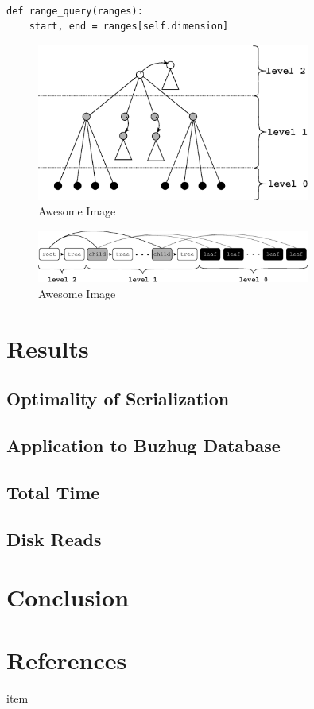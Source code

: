 \documentclass[11pt, oneside]{article}
\begin{document}
\begin{verbatim}

def range_query(ranges):
    start, end = ranges[self.dimension]

\end{verbatim}

\begin{figure}[p]
    \centering
    \includegraphics[width=0.8\textwidth]{fig1.eps}
    \caption{Awesome Image}
\end{figure}
\begin{figure}[p]
    \centering
    \includegraphics[width=0.8\textwidth]{fig2.eps}
    \caption{Awesome Image}
\end{figure}

\section{Results}

\subsection{Optimality of Serialization}

\subsection{Application to Buzhug Database}


\subsection{Total Time}

\subsection{Disk Reads}

\section{Conclusion}


\section{References}

\noindent

\begin{description}

\item item

\end{description}
\end{document}
